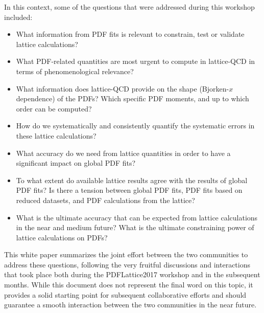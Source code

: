 In this context, some of the questions that were addressed during this workshop
included:
\begin{itemize}
\item What information from PDF fits is relevant to constrain, test or validate lattice calculations?

\item What PDF-related quantities are most urgent
  to compute in lattice-QCD in terms of phenomenological relevance?

\item What information does lattice-QCD provide on the
  shape (Bjorken-$x$ dependence) of the PDFs? Which specific
  PDF moments,
  and up to which order can be computed?
  
\item How do we systematically and consistently quantify the systematic errors in these lattice calculations?

\item What accuracy do we need from lattice quantities 
  in order to have a significant impact on global PDF fits?

\item To what extent do available lattice results agree with the results of
  global PDF fits? Is there a tension between global PDF fits, PDF
  fits based on reduced datasets, and PDF calculations from the lattice?

  \item What is the ultimate accuracy that can be expected from lattice
calculations in the near and medium future? What is the ultimate
constraining power of lattice calculations on PDFs?

\end{itemize}

This white paper summarizes the joint
effort between the two communities to address these questions, 
following the very fruitful discussions and interactions that took place both during 
the PDFLattice2017 workshop and in the subsequent months.
%
While this document does not represent the final word on this topic,
it provides a solid starting point for subsequent collaborative efforts
and should guarantee a smooth 
interaction between the two communities in the near future.

